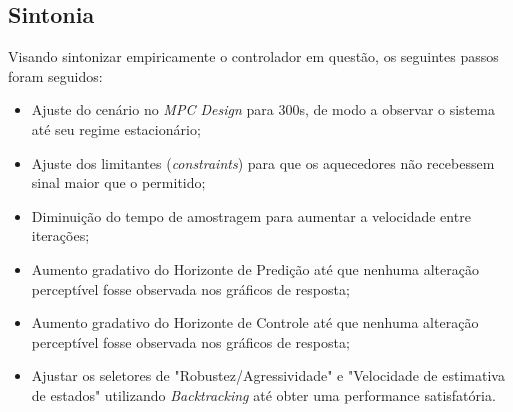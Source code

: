 \begin{apendicesenv}
\clearpage

\section{Sintonia}

Visando sintonizar empiricamente o controlador em questão, os seguintes passos foram seguidos:

\begin{itemize}
	\item Ajuste do cenário no \textit{MPC Design} para 300s, de modo a observar o sistema até seu regime estacionário;
	\item Ajuste dos limitantes (\textit{constraints}) para que os aquecedores não recebessem sinal maior que o permitido;
	\item Diminuição do tempo de amostragem para aumentar a velocidade entre iterações;
	\item Aumento gradativo do Horizonte de Predição até que nenhuma alteração perceptível fosse observada nos gráficos de resposta;
	\item Aumento gradativo do Horizonte de Controle até que nenhuma alteração perceptível fosse observada nos gráficos de resposta;
	\item Ajustar os seletores de "Robustez/Agressividade" e "Velocidade de estimativa de estados" utilizando \textit{Backtracking} até obter uma performance satisfatória.
\end{itemize}



\end{apendicesenv}